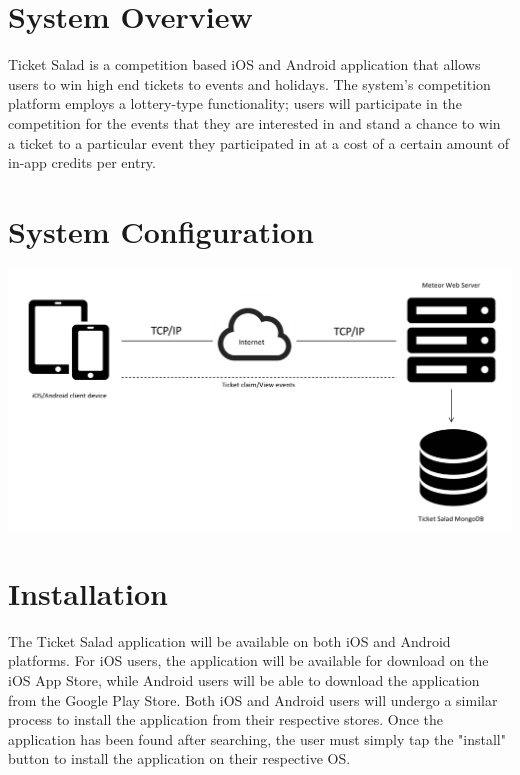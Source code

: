 \documentclass[11pt]{article}
\begin{document}
		\newpage
		\tableofcontents
	
	
	\newpage
	
	\section{System Overview}
	Ticket Salad is a competition based iOS and Android application that allows users to win high end
	tickets to events and holidays. The system's competition platform employs a
	lottery-type functionality; users will participate in the competition for the
	events that they are interested in and stand a chance to win a ticket to a
	particular event they participated in at a cost of a certain amount of in-app credits per entry.
	
	\section{System Configuration}

  	\includegraphics[width=\linewidth]{config.png}
	
	\section{Installation}
	
	The Ticket Salad application will be available on both iOS and Android platforms.
	For iOS users, the application will be available for download on the iOS App Store, while
	Android users will be able to download the application from the Google Play Store. Both iOS and Android 		users will undergo a similar process to install the application from their respective stores. Once the application 	has been found after searching, the user must simply tap the "install" button to install the application on their 	respective OS.
	
\end{document}
